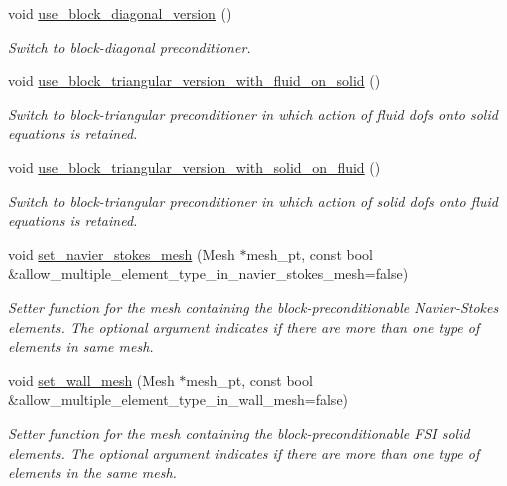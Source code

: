 \begin{DoxyCompactItemize}
void \hyperlink{classoomph_1_1FSIPreconditioner_a8cdc0304cf22456a8b27ef95f5560e0b}{use\+\_\+block\+\_\+diagonal\+\_\+version} ()
\begin{DoxyCompactList}\small\item\em Switch to block-\/diagonal preconditioner. \end{DoxyCompactList}\item 
void \hyperlink{classoomph_1_1FSIPreconditioner_ad6e461da68c8e7f87b86f38fcd67ec69}{use\+\_\+block\+\_\+triangular\+\_\+version\+\_\+with\+\_\+fluid\+\_\+on\+\_\+solid} ()
\begin{DoxyCompactList}\small\item\em Switch to block-\/triangular preconditioner in which action of fluid dofs onto solid equations is retained. \end{DoxyCompactList}\item 
void \hyperlink{classoomph_1_1FSIPreconditioner_a193bbf986401ecb843e71581460004ad}{use\+\_\+block\+\_\+triangular\+\_\+version\+\_\+with\+\_\+solid\+\_\+on\+\_\+fluid} ()
\begin{DoxyCompactList}\small\item\em Switch to block-\/triangular preconditioner in which action of solid dofs onto fluid equations is retained. \end{DoxyCompactList}\item 
void \hyperlink{classoomph_1_1FSIPreconditioner_a5d70612246bd08bec6c7b373da5e9c80}{set\+\_\+navier\+\_\+stokes\+\_\+mesh} (Mesh $\ast$mesh\+\_\+pt, const bool \&allow\+\_\+multiple\+\_\+element\+\_\+type\+\_\+in\+\_\+navier\+\_\+stokes\+\_\+mesh=false)
\begin{DoxyCompactList}\small\item\em Setter function for the mesh containing the block-\/preconditionable Navier-\/\+Stokes elements. The optional argument indicates if there are more than one type of elements in same mesh. \end{DoxyCompactList}\item 
void \hyperlink{classoomph_1_1FSIPreconditioner_a61d583e9d3a1596efe22b11950fb47a5}{set\+\_\+wall\+\_\+mesh} (Mesh $\ast$mesh\+\_\+pt, const bool \&allow\+\_\+multiple\+\_\+element\+\_\+type\+\_\+in\+\_\+wall\+\_\+mesh=false)
\begin{DoxyCompactList}\small\item\em Setter function for the mesh containing the block-\/preconditionable F\+SI solid elements. The optional argument indicates if there are more than one type of elements in the same mesh. \end{DoxyCompactList}\item 

\end{DoxyCompactItemize}
